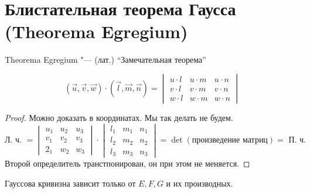 \section{Блистательная теорема Гаусса (Theorema Egregium)}

Theorema Egregium "--- (лат.) ``Замечательная теорема''

\begin{lemma}
	$$ (\vec u, \vec v, \vec w) \cdot (\vec l, \vec m, \vec n) =
	\begin{vmatrix}
		u \cdot l & u \cdot m & u \cdot n \\
		v \cdot l & v \cdot m & v \cdot n \\
		w \cdot l & w \cdot m & w \cdot n
	\end{vmatrix} $$
\end{lemma}

\begin{proof}
	Можно доказать в координатах. Мы так делать не будем.
	$$ \text{Л. ч. } =
	\begin{vmatrix}
		u_1 & u_2 & u_3 \\
		v_1 & v_2 & v_3 \\
		2_1 & w_2 & w_3
	\end{vmatrix} \cdot
	\begin{vmatrix}
		l_1 & m_1 & n_1 \\
		l_2 & m_2 & n_2 \\
		l_3 & m_3 & n_3
	\end{vmatrix} = \det(\text{произведение матриц}) = \text{ П. ч.} $$
	Второй определитель транстпонирован, \as он при этом не меняется.
\end{proof}

\begin{theorem}[Egregium]
	Гауссова кривизна зависит только от $ E, F, G $ и их производных.
\end{theorem}

